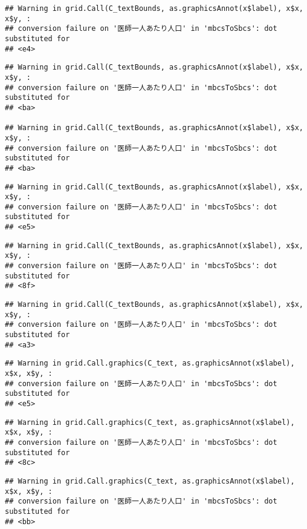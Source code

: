 \documentclass[
]{article}
\begin{document}
\begin{verbatim}
## Warning in grid.Call(C_textBounds, as.graphicsAnnot(x$label), x$x, x$y, :
## conversion failure on '医師一人あたり人口' in 'mbcsToSbcs': dot substituted for
## <e4>
\end{verbatim}

\begin{verbatim}
## Warning in grid.Call(C_textBounds, as.graphicsAnnot(x$label), x$x, x$y, :
## conversion failure on '医師一人あたり人口' in 'mbcsToSbcs': dot substituted for
## <ba>

## Warning in grid.Call(C_textBounds, as.graphicsAnnot(x$label), x$x, x$y, :
## conversion failure on '医師一人あたり人口' in 'mbcsToSbcs': dot substituted for
## <ba>
\end{verbatim}

\begin{verbatim}
## Warning in grid.Call(C_textBounds, as.graphicsAnnot(x$label), x$x, x$y, :
## conversion failure on '医師一人あたり人口' in 'mbcsToSbcs': dot substituted for
## <e5>
\end{verbatim}

\begin{verbatim}
## Warning in grid.Call(C_textBounds, as.graphicsAnnot(x$label), x$x, x$y, :
## conversion failure on '医師一人あたり人口' in 'mbcsToSbcs': dot substituted for
## <8f>
\end{verbatim}

\begin{verbatim}
## Warning in grid.Call(C_textBounds, as.graphicsAnnot(x$label), x$x, x$y, :
## conversion failure on '医師一人あたり人口' in 'mbcsToSbcs': dot substituted for
## <a3>
\end{verbatim}

\begin{verbatim}
## Warning in grid.Call.graphics(C_text, as.graphicsAnnot(x$label), x$x, x$y, :
## conversion failure on '医師一人あたり人口' in 'mbcsToSbcs': dot substituted for
## <e5>
\end{verbatim}

\begin{verbatim}
## Warning in grid.Call.graphics(C_text, as.graphicsAnnot(x$label), x$x, x$y, :
## conversion failure on '医師一人あたり人口' in 'mbcsToSbcs': dot substituted for
## <8c>
\end{verbatim}

\begin{verbatim}
## Warning in grid.Call.graphics(C_text, as.graphicsAnnot(x$label), x$x, x$y, :
## conversion failure on '医師一人あたり人口' in 'mbcsToSbcs': dot substituted for
## <bb>
\end{verbatim}
\end{document}
